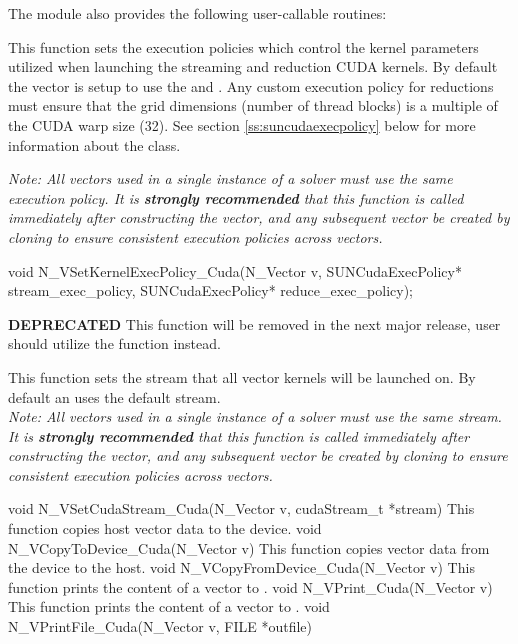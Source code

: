 The module {\nveccuda} also provides the following user-callable routines:
{
  This function sets the execution policies which control the kernel parameters
  utilized when launching the streaming and reduction CUDA kernels. By default
  the vector is setup to use the  and 
  . Any custom execution policy for reductions
  must ensure that the grid dimensions (number of thread blocks) is a multiple of
  the CUDA warp size (32). See section \ref{ss:suncudaexecpolicy} below for more
  information about the  class.

  \textit{Note: All vectors used in a single instance of a {\sundials} solver must
  use the same execution policy. It is \textbf{strongly recommended} that
  this function is called immediately after constructing the vector, and
  any subsequent vector be created by cloning to ensure consistent execution
  policies across vectors.}
}
{
  void N\_VSetKernelExecPolicy\_Cuda(N\_Vector v, 
                                    SUNCudaExecPolicy* stream\_exec\_policy,
                                    SUNCudaExecPolicy* reduce\_exec\_policy);
}
{
  \textbf{DEPRECATED} This function will be removed in the next major release,
  user should utilize the  function instead.

  This function sets the {\cuda} stream that all vector kernels will be launched on.
  By default an {\nveccuda} uses the default {\cuda} stream.\\

  \textit{Note: All vectors used in a single instance of a {\sundials} solver must
  use the same {\cuda} stream. It is \textbf{strongly recommended} that
  this function is called immediately after constructing the vector, and
  any subsequent vector be created by cloning to ensure consistent execution
  policies across vectors.}
}
{
  void N\_VSetCudaStream\_Cuda(N\_Vector v, cudaStream\_t *stream)
}
{
 This function copies host vector data to the device.
}
{
 void N\_VCopyToDevice\_Cuda(N\_Vector v)
}
{
 This function copies vector data from the device to the host.
}
{
 void N\_VCopyFromDevice\_Cuda(N\_Vector v)
}
{
  This function prints the content of a {\cuda} vector to .
}
{
  void N\_VPrint\_Cuda(N\_Vector v)
}
{
  This function prints the content of a {\cuda} vector to .
}
{
  void N\_VPrintFile\_Cuda(N\_Vector v, FILE *outfile)
}

